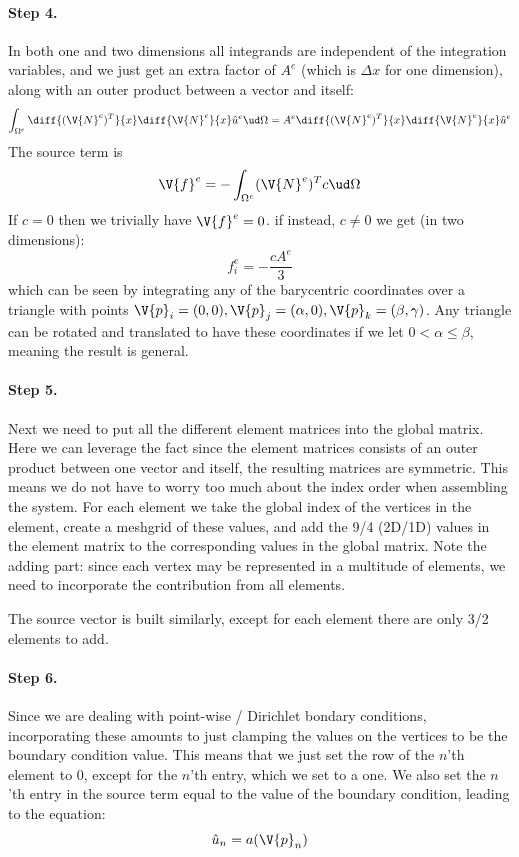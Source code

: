 \documentclass[sigconf]{acmart}
\begin{document}
\paragraph{Step 4.} In both one and two dimensions all integrands are independent of the integration variables, and we just get an extra factor of $ A^e $ (which is $ \Delta x $ for one dimension), along with an outer product between a vector and itself:
\begin{equation}\label{key}
	\int_{\Omega^e} \diff{(\V{N}^e)^T}{x} \diff{\V{N}^e}{x} \hat{u}^e \ud \Omega = A^e \diff{(\V{N}^e)^T}{x} \diff{\V{N}^e}{x} \hat{u}^e
\end{equation}
The source term is 
\begin{equation}\label{key}
	\V{f}^e = -\int_{\Omega^e} (\V{N}^e)^T c \ud \Omega
\end{equation}
If $ c = 0 $ then we trivially have $ \V{f}^e = 0 $. if instead, $ c \neq 0 $ we get (in two dimensions):
\begin{equation}\label{key}
	f^e_i = -\frac{cA^e}{3}
\end{equation}
which can be seen by integrating any of the barycentric coordinates over a triangle with points $ \V{p}_i = (0,0), \V{p}_j = (\alpha, 0), \V{p}_k = (\beta, \gamma) $. Any triangle can be rotated and translated to have these coordinates if we let $ 0 < \alpha \leq \beta $, meaning the result is general.



\paragraph{Step 5.} Next we need to put all the different element matrices into the global matrix. Here we can leverage the fact since the element matrices consists of an outer product between one vector and itself, the resulting matrices are symmetric. This means we do not have to worry too much about the index order when assembling the system. For each element we take the global index of the vertices in the element, create a meshgrid of these values, and add the 9/4 (2D/1D) values in the element matrix to the corresponding values in the global matrix. Note the adding part: since each vertex may be represented in a multitude of elements, we need to incorporate the contribution from all elements.

The source vector is built similarly, except for each element there are only 3/2 elements to add.

\paragraph{Step 6.}
Since we are dealing with point-wise / Dirichlet bondary conditions, incorporating these amounts to just clamping the values on the vertices to be the boundary condition value. This means that we just set the row of the $ n $'th element to 0, except for the $ n $'th entry, which we set to a one. We also set the $ n $'th entry in the source term equal to the value of the boundary condition, leading to the equation:
\begin{equation}\label{key}
	\hat{u}_n = a(\V{p}_n)
\end{equation}
\end{document}
